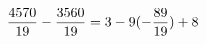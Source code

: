 \documentclass[preview]{standalone}
\begin{document}
\begin{align*}
\special{dvisvgm:raw <g id='unique000'>}\frac{4570}{19} - \frac{3560}{19} = 3 - 9 (- \frac{89}{19}) + 8\special{dvisvgm:raw </g>}
\end{align*}
\end{document}
